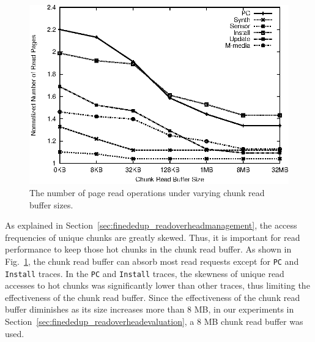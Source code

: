 \begin{figure}[t]
	\center
	\includegraphics[scale=0.8]{figure/finededup/buffersize}
	\caption{The number of page read operations under varying chunk read buffer sizes.} %
	\label{fig:buffersize}
\end{figure}

As explained in Section~\ref{sec:finededup_readoverheadmanagement}, the access frequencies of unique chunks are greatly skewed.
Thus, it is important for read performance to keep those hot chunks in the chunk read buffer.
As shown in Fig.~\ref{fig:buffersize}, the chunk read buffer can absorb most read requests 
except for \texttt{PC} and \texttt{Install} traces.
In the \texttt{PC} and \texttt{Install} traces, 
the skewness of unique read accesses to hot chunks was significantly lower than other traces, thus
limiting the effectiveness of the chunk read buffer.
Since the effectiveness of the chunk read buffer diminishes as its size increases more than 8 MB,
in our experiments in Section~\ref{sec:finededup_readoverheadevaluation}, a 8 MB chunk read buffer was used.

